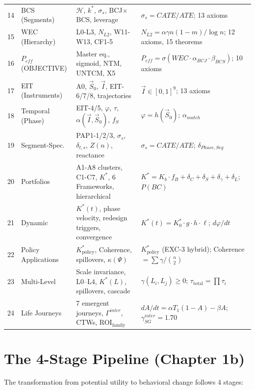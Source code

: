 \begin{center}
\begin{longtable}{clll}
14 & BCS (Segments) & $\mathcal{H}$, $k^*$, $\sigma_s$, BCJ$\times$BCS, leverage & $\sigma_s = CATE/ATE$; 13 axioms \\
15 & WEC (Hierarchy) & L0-L3, $N_{L2}$, W11-W13, CF1-5 & $N_{L2} = \alpha \gamma n(1-m)/\log n$; 12 axioms, 15 theorems \\
16 & $P_{eff}$ (OBJECTIVE) & Master eq., sigmoid, NTM, UNTCM, X5 & $P_{eff} = \sigma(WEC \cdot \alpha_{BCJ} \cdot \beta_{BCS})$; 10 axioms \\
17 & EIT (Instruments) & A0, $\vec{S}_0$, $\vec{I}$, EIT-6/7/8, trajectories & $\vec{I} \in [0,1]^9$; 13 axioms \\
18 & Temporal (Phase) & EIT-4/5, $\varphi$, $\tau$, $\alpha(\vec{I},\vec{S}_0)$, $f_S$ & $\varphi = h(\vec{S}_0)$; $\alpha_{match}$ \\
\midrule
19 & Segment-Spec. & PAP1-1/2/3, $\sigma_s$, $\delta_{t,s}$, $Z(n)$, reactance & $\sigma_s = CATE/ATE$; $\delta_{Phase,Seg}$ \\
20 & Portfolios & A1-A8 clusters, C1-C7, $K^*$, 6 Frameworks, hierarchical & $K^* = K_b \cdot f_B + \delta_C + \delta_S + \delta_\gamma + \delta_L$; $P(BC)$ \\
21 & Dynamic & $K^*(t)$, phase velocity, redesign triggers, convergence & $K^*(t) = K^*_0 \cdot g \cdot h \cdot \ell$; $d\varphi/dt$ \\
\midrule
22 & Policy Applications & $K^*_{\text{policy}}$, Coherence, spillovers, $\kappa(\Psi)$ & $K^*_{\text{policy}}$ (EXC-3 hybrid); Coherence $= \sum \gamma / \binom{n}{2}$ \\
23 & Multi-Level & Scale invariance, L0--L4, $K^*(L)$, spillovers, cascade & $\gamma(L_i, L_j) \geq 0$; $\tau_{\text{total}} = \prod \tau_i$ \\
24 & Life Journeys & 7 emergent journeys, $\Gamma^{inter}$, CTWs, ROI$_{\text{family}}$ & $dA/dt = \alpha T_1(1-A) - \beta A$; $\gamma^{inter}_{SG} = 1.70$ \\
\bottomrule
\end{longtable}
\end{center}

\section{The 4-Stage Pipeline (Chapter 1b)}
\label{sec:mp-pipeline}

The transformation from potential utility to behavioral change follows 4 stages:

